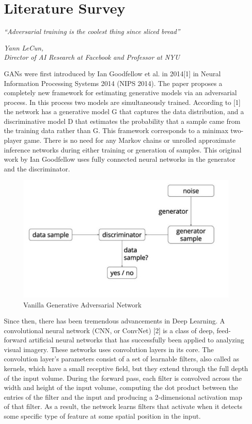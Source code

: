 \chapter{Literature Survey}\label{ch:literature_survey}
\epigraph{\textit{\Large “Adversarial training is the coolest thing since sliced bread”}}{\textit{ \large Yann LeCun,\\ Director of AI Research at Facebook and Professor at NYU}}
GANs were first introduced by Ian Goodfellow et al. in 2014[1] in Neural Information Processing Systems 2014 (NIPS 2014). The paper proposes a completely new framework for estimating generative models via an adversarial process. In this process two models are simultaneously trained. According to [1] the network has a generative model G that captures the data distribution, and a discriminative model D that estimates the probability that a sample came from the training data rather than G. This framework corresponds to a minimax two-player game. There is no need for any Markov chains or unrolled approximate inference networks during either training or generation of samples. This original work by Ian Goodfellow uses fully connected neural networks in the generator and the discriminator.\par\bigskip
\begin{figure}[H]
\centering\includegraphics[width=.7\textwidth]{images/vanilaGAN.jpg}
\caption{Vanilla Generative Adversarial Network}
\end{figure}
Since then, there has been tremendous advancements in Deep Learning. A convolutional neural network (CNN, or ConvNet) [2] is a class of deep, feed-forward artificial neural networks that has successfully been applied to analyzing visual imagery. These networks uses convolution layers in its core. The convolution layer's parameters consist of a set of learnable filters, also called as kernels, which have a small receptive field, but they extend through the full depth of the input volume. During the forward pass, each filter is convolved across the width and height of the input volume, computing the dot product between the entries of the filter and the input and producing a 2-dimensional activation map of that filter. As a result, the network learns filters that activate when it detects some specific type of feature at some spatial position in the input.\par\bigskip
